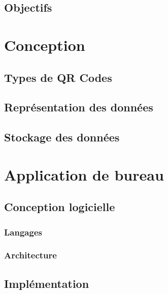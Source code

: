 \documentclass{report}
\begin{document}
	\section{Objectifs}
		 \label{objectifs}


		
\chapter{Conception}

	\section{Types de QR Codes}
		 \label{typesQR}
		
	\newpage
		
	\section{Représentation des données}
		 \label{representationDonnees}
		
	\section{Stockage des données}
		 \label{stockage}
		

\chapter{Application de bureau}

	\section{Conception logicielle}
		
		\subsection{Langages}
			 \label{langages}
			
		\subsection{Architecture}		
			 \label{architecture}
				
	\newpage
	\section{Implémentation}
		
\end{document}
